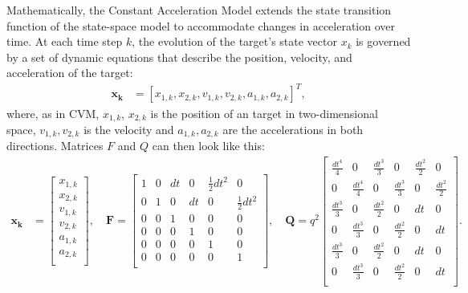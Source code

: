 Mathematically, the Constant Acceleration Model extends the state transition function of the state-space model to
accommodate changes in acceleration over time. At each time step $k$, the evolution of the target's state vector $x_k$ is governed by a set of dynamic equations that describe the position, velocity, and acceleration of the target:
\begin{align}
    \mathbf{x_k} &= [x_{1,k}, x_{2,k}, v_{1,k}, v_{2,k}, a_{1,k}, a_{2,k}]^T,
\end{align}
where, as in CVM, $x_{1,k}$, $x_{2,k}$ is the position of an target in two-dimensional space, $v_{1,k}, v_{2,k}$ is
the velocity and $a_{1,k}, a_{2,k}$ are the accelerations in both directions. Matrices $F$ and $Q$ can then look like
this:
\begin{align}
    \mathbf{x_k} &=
    \begin{bmatrix}
        x_{1,k} \\
        x_{2,k} \\
        v_{1,k} \\
        v_{2,k} \\
        a_{1,k} \\
        a_{2,k} \\
    \end{bmatrix},
    \quad \mathbf{F} =
    \begin{bmatrix}
        1 & 0 & dt & 0 & \frac{1}{2}dt^2 & 0\\
        0 & 1 & 0 & dt & 0 & \frac{1}{2}dt^2\\
        0 & 0 & 1 & 0 & 0 & 0\\
        0 & 0 & 0 & 1 & 0 & 0\\
        0 & 0 & 0 & 0 & 1 & 0\\
        0 & 0 & 0 & 0 & 0 & 1\\
    \end{bmatrix},
    \quad \mathbf{Q} = q^2
    \begin{bmatrix}
        \frac{dt^4}{4} & 0 & \frac{dt^3}{3} & 0 & \frac{dt^2}{2} & 0\\
        0 & \frac{dt^4}{4} & 0 & \frac{dt^3}{3} & 0 & \frac{dt^2}{2}\\
        \frac{dt^3}{3} & 0 & \frac{dt^2}{2} & 0 & dt & 0\\
        0 & \frac{dt^3}{3} & 0 & \frac{dt^2}{2} & 0 & dt \\
        \frac{dt^3}{3} & 0 & \frac{dt^2}{2} & 0 & dt & 0\\
        0 & \frac{dt^3}{3} & 0 & \frac{dt^2}{2} & 0 & dt \\
    \end{bmatrix}.
\end{align}
